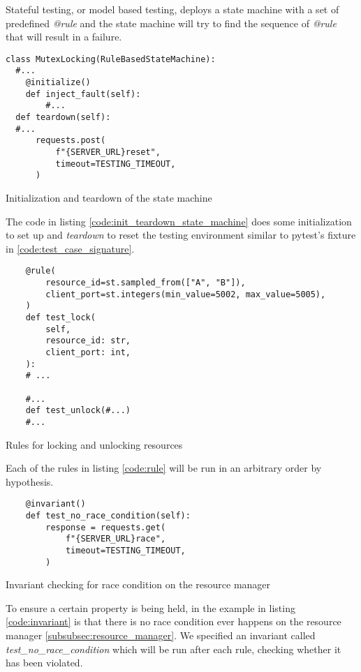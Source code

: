 Stateful testing, or model based testing, deploys a state machine with a set of 
predefined \textit{@rule} and the state machine will try to find the sequence
of \textit{@rule} that will result in a failure.

\begin{listing}[!ht]
  \begin{verbatim}
class MutexLocking(RuleBasedStateMachine):
  #... 
    @initialize()
    def inject_fault(self):
        #...
  def teardown(self):
  #...
      requests.post(
          f"{SERVER_URL}reset",
          timeout=TESTING_TIMEOUT,
      )
 \end{verbatim}
 \caption{Initialization and teardown of the state machine}
 \label{code:init_teardown_state_machine}
\end{listing}

The code in listing \ref{code:init_teardown_state_machine} does some initialization to set
up and \textit{teardown} to reset the testing environment similar to pytest's fixture 
in \ref{code:test_case_signature}.

\begin{listing}[!ht]
  \begin{verbatim}
    @rule(
        resource_id=st.sampled_from(["A", "B"]),
        client_port=st.integers(min_value=5002, max_value=5005),
    )
    def test_lock(
        self,
        resource_id: str,
        client_port: int,
    ):
    # ...

    #... 
    def test_unlock(#...)
    #... 
  \end{verbatim}
  \caption{Rules for locking and unlocking resources}
  \label{code:rule}
\end{listing}

Each of the rules in listing \ref{code:rule} will be run in an arbitrary order by hypothesis.

\begin{listing}[!ht]
  \begin{verbatim}
    @invariant()
    def test_no_race_condition(self):
        response = requests.get(
            f"{SERVER_URL}race",
            timeout=TESTING_TIMEOUT,
        )
  \end{verbatim}
  \caption{Invariant checking for race condition on the resource manager}
  \label{code:invariant}
\end{listing}

To ensure a certain property is being held, in the example in listing \ref{code:invariant} is that there is 
no race condition ever happens on the resource manager \ref{subsubsec:resource_manager}.
We specified an invariant called \textit{test\_no\_race\_condition} which will be run 
after each rule, checking whether it has been violated.

